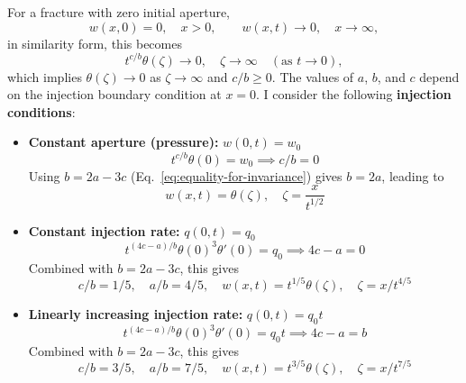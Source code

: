 \documentclass[12pt]{article}
\begin{document}
For a fracture with zero initial aperture,
\begin{equation*}
	w(x,0) = 0, \quad x>0, \qquad w(x,t) \to 0, \quad x \to \infty,
\end{equation*}
in similarity form, this becomes
\begin{equation*}
	t^{c / b} \theta(\zeta) \to 0, \quad \zeta \to \infty \quad (\text{as } t \to 0),
\end{equation*}
which implies $\theta(\zeta) \to 0$ as $\zeta \to \infty$ and $c / b \ge 0$. The values of $a$, $b$, and $c$ depend on the injection boundary condition at $x=0$. I consider the following \textbf{injection conditions}:
\begin{itemize}
	\item \textbf{Constant aperture (pressure):} $w(0,t) = w_0$
	      \begin{equation*}
		      t^{c / b} \theta(0) = w_0 \implies c/b = 0
	      \end{equation*}
	      Using $b = 2a - 3c$ (Eq.~\ref{eq:equality-for-invariance}) gives $b = 2a$, leading to
	      \begin{equation*}
		      w(x,t) = \theta(\zeta), \quad \zeta = \frac{x}{t^{1/2}}
	      \end{equation*}

	\item \textbf{Constant injection rate:} $q(0,t) = q_0$
	      \begin{equation*}
		      t^{(4c-a)/b} \theta(0)^3 \theta'(0) = q_0 \implies 4c-a = 0
	      \end{equation*}
	      Combined with $b = 2a - 3c$, this gives
	      \begin{equation*}
		      c/b = 1/5, \quad a/b = 4/5, \quad w(x,t) = t^{1/5} \theta(\zeta), \quad \zeta = x / t^{4/5}
	      \end{equation*}

	\item \textbf{Linearly increasing injection rate:} $q(0,t) = q_0t$
	      \begin{equation*}
		      t^{(4c-a)/b} \theta(0)^3 \theta'(0) = q_0t \implies 4c-a = b
	      \end{equation*}
	      Combined with $b = 2a - 3c$, this gives
	      \begin{equation*}
		      c/b = 3/5, \quad a/b = 7/5, \quad w(x,t) = t^{3/5} \theta(\zeta), \quad \zeta = x / t^{7/5}
	      \end{equation*}

\end{itemize}
\end{document}
